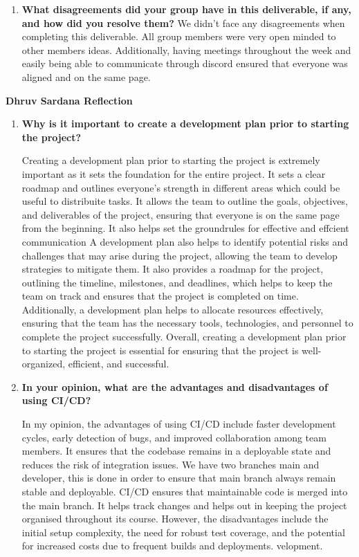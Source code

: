 \documentclass{article}
\begin{document}
\begin{enumerate}
\begin{enumerate}
    \item \textbf{What disagreements did your group have in this deliverable, if any,
    and how did you resolve them?}\newline
    We didn't face any disagreements when completing this deliverable. All group members were very open minded to other members ideas. Additionally, having meetings throughout the week and easily being able to communicate through discord ensured that everyone was aligned and on the same page. 

\end{enumerate}

\textbf{Dhruv Sardana Reflection}
\begin{enumerate}
    \item  \textbf{Why is it important to create a development plan prior to starting the
    project?} \newline

    Creating a development plan prior to starting the project is extremely important as it sets the foundation for the entire project. It sets a clear roadmap and outlines everyone's strength in different areas which could be useful to distribuite tasks.
    It allows the team to outline the goals, objectives, and deliverables of the project, ensuring that everyone is on the same page from the beginning. It also helps set the groundrules for effective and effcient communication
    A development plan also helps to identify potential risks and challenges that may arise during the project, allowing the team to develop strategies to mitigate them. 
    It also provides a roadmap for the project, outlining the timeline, milestones, and deadlines, which helps to keep the team on track and ensures that the project is completed on time.
    Additionally, a development plan helps to allocate resources effectively, ensuring that the team has the necessary tools, technologies, and personnel to complete the project successfully. 
    Overall, creating a development plan prior to starting the project is essential for ensuring that the project is well-organized, efficient, and successful.

    
    \item \textbf{In your opinion, what are the advantages and disadvantages of using
    CI/CD?} \newline

    In my opinion, the advantages of using CI/CD include faster development cycles, early detection of bugs, and improved collaboration among team members. It ensures that the codebase remains in a deployable state and reduces the risk of integration issues.
    We have two branches main and developer, this is done in order to ensure that main branch always remain stable and deployable. CI/CD ensures that maintainable code is merged into the main branch. It helps track changes and helps out in keeping the project organised throughout its course.
    However, the disadvantages include the initial setup complexity, the need for robust test coverage, and the potential for increased costs due to frequent builds and deployments.
  velopment.


\end{enumerate}
\end{enumerate}
\end{document}
